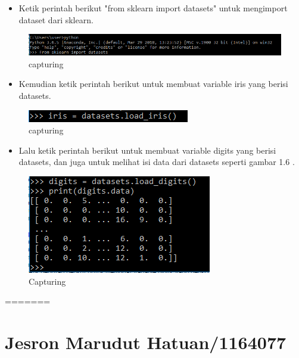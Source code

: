 \begin{enumerate}
\begin{itemize}
\item Ketik perintah berikut "from sklearn import datasets" untuk mengimport dataset dari sklearn.
\end{itemize}
\begin{figure}[ht]
\centering
\includegraphics[scale=0.5]{figures/4.png}
\caption{capturing}
\label{Import Datasets}
\end{figure}
\begin{itemize}
\item Kemudian ketik perintah berikut  untuk membuat variable iris yang berisi datasets.
\end{itemize}
\begin{figure}[ht]
\centering
\includegraphics[scale=0.9]{figures/5.png}
\caption{capturing}
\label{Variable Iris}
\end{figure}
\begin{itemize}
\item Lalu ketik perintah berikut untuk membuat variable digits yang berisi datasets, dan juga untuk melihat isi data dari datasets seperti gambar 1.6 .
\end{itemize}
\begin{figure}[ht]
\centering
\includegraphics[scale=0.9]{figures/8.png}
\caption{Capturing}
\label{Variable Digits}
\end{figure}



\end{enumerate}

=======


\section{Jesron Marudut Hatuan/1164077}
